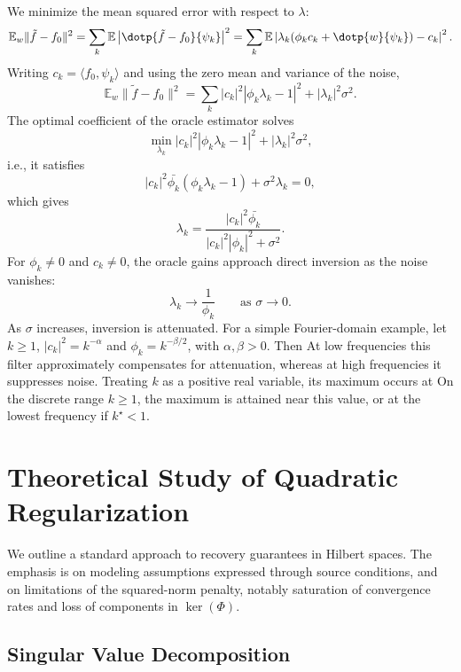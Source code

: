We minimize the mean squared error with respect to $\lambda$:
$$
	\mathbb{E}_w  \|\tilde{f} - f_0\|^2  = \sum_k \mathbb{E}  \left| \dotp{\tilde{f} - f_0}{\psi_k} \right|^2 = \sum_k \mathbb{E} \left| \lambda_k (\phi_k c_k + \dotp{w}{\psi_k}) - c_k \right|^2 .
$$
Writing $c_k=\langle f_0,\psi_k\rangle$ and using the zero mean and variance of the noise,
$$
	\mathbb{E}_w \|\tilde{f} - f_0\|^2 = \sum_k |c_k|^2 | \phi_k \lambda_k - 1 |^2 + |\lambda_k|^2 \sigma^2 .
$$
The optimal coefficient of the oracle estimator solves
$$
	\min_{\lambda_k} |c_k|^2 | \phi_k \lambda_k - 1 |^2 + |\lambda_k|^2 \sigma^2 ,
$$
i.e., it satisfies
$$
	|c_k|^2 \bar{\phi_k} ( \phi_k \lambda_k - 1 ) + \sigma^2 \lambda_k = 0,
$$
which gives
$$
	\lambda_k = \frac{ |c_k|^2 \bar{\phi_k} }{ |c_k|^2 |\phi_k|^2 + \sigma^2 }.
$$
For $\phi_k \neq 0$ and $c_k\neq0$, the oracle gains approach direct inversion as the noise vanishes:
$$
	\lambda_k \longrightarrow \frac{1}{\phi_k}\qquad\text{as }\sigma\to0.
$$
As $\sigma$ increases, inversion is attenuated. For a simple Fourier-domain example, let $k\geq1$, $|c_k|^2=k^{-\alpha}$ and $\phi_k=k^{-\beta/2}$, with $\alpha,\beta>0$. Then
At low frequencies this filter approximately compensates for attenuation, whereas at high frequencies it suppresses noise. Treating $k$ as a positive real variable, its maximum occurs at
On the discrete range $k\geq1$, the maximum is attained near this value, or at the lowest frequency if $k^\star<1$.

\section{Theoretical Study of Quadratic Regularization}

We outline a standard approach to recovery guarantees in Hilbert spaces. The emphasis is on modeling assumptions expressed through source conditions, and on limitations of the squared-norm penalty, notably saturation of convergence rates and loss of components in $\ker(\Phi)$.

\subsection{Singular Value Decomposition}


